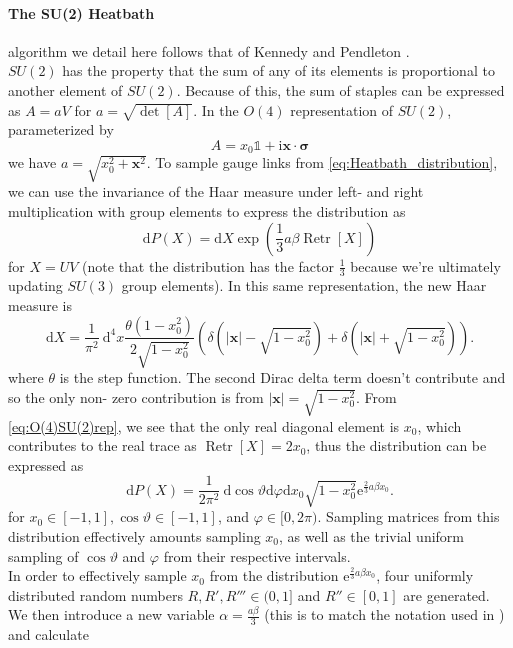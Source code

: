 \documentclass[a4paper,10pt]{article}
\begin{document}
\paragraph{The SU(2) Heatbath} algorithm we detail here follows that of Kennedy and Pendleton \cite{KENNEDY1985393}.\\$SU(2)$ has the property that the sum of any of its elements is proportional to another element of $SU(2)$. Because of this, the sum of staples can be expressed as $A = aV$ for $a=\sqrt{\operatorname{det}[A]}$. In the $O(4)$ representation of $SU(2)$, parameterized by 
\begin{equation}\label{eq:O(4)SU(2)rep}
A=x_{0} \mathbb{1}+\mathrm{i} \boldsymbol{x} \cdot \boldsymbol{\sigma}
\end{equation}
we have $a = \sqrt{x_0^2 +\mathbf{x}^2}$. To sample gauge links from \eqref{eq:Heatbath_distribution}, we can use the invariance of the Haar measure under left- and right multiplication with group elements to express the distribution as
\begin{equation}
\mathrm{d} P(X)=\mathrm{d} X \exp \left(\frac{1}{3} a \beta \operatorname{Retr}[X]\right)
\end{equation}
for $X = UV$ (note that the distribution has the factor $\frac{1}{3}$ because we're ultimately updating $SU(3)$ group elements). In this same representation, the new Haar measure is
\begin{equation}
\mathrm{d} X=\frac{1}{\pi^{2}} \mathrm{~d}^{4} x \frac{\theta\left(1-x_{0}^{2}\right)}{2 \sqrt{1-x_{0}^{2}}}\left(\delta\left(|\boldsymbol{x}|-\sqrt{1-x_{0}^{2}}\right)+\delta\left(|\boldsymbol{x}|+\sqrt{1-x_{0}^{2}}\right)\right).
\end{equation}
where $\theta$ is the step function. The second Dirac delta term doesn't contribute
and so the only non- zero contribution is from $|\boldsymbol{x}| = \sqrt{1-x_{0}^{2}}$. From \eqref{eq:O(4)SU(2)rep}, we see that the only real diagonal element is $x_0$, which contributes to the real trace as $\operatorname{Retr}[X] = 2x_0$, thus the distribution can be expressed as 
\begin{equation}
\mathrm{d} P(X)=\frac{1}{2 \pi^{2}} \mathrm{~d} \cos \vartheta \mathrm{d} \varphi \mathrm{d} x_{0} \sqrt{1-x_{0}^{2}} \mathrm{e}^{\frac{2}{3}a \beta x_{0}}.
\end{equation}
for $x_{0} \in[-1,1], \cos \vartheta \in[-1,1]$, and $\varphi \in[0,2 \pi)$.
Sampling matrices from this distribution effectively amounts sampling $ x_{0}$, as well as the trivial uniform sampling of $\cos \vartheta$ and $\varphi$ from their respective intervals.\\In order to effectively sample $x_0$ from the distribution $\mathrm{e}^{\frac{2}{3}a \beta x_{0}}$, four uniformly distributed random numbers $R,R',R''' \in (0,1]$ and $R''\in [0,1]$ are generated. We then introduce a new variable $\alpha =\frac{a\beta}{3} $ (this is to match the notation used in \cite{KENNEDY1985393}) and calculate 
\end{document}
